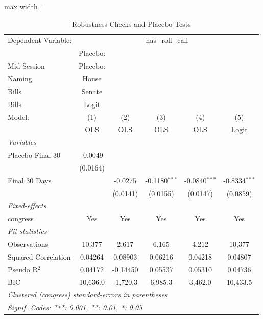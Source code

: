
\begin{table}[htbp]
   \caption{\label{tab:robust} Robustness Checks and Placebo Tests}
   \centering
   \small
   \begin{adjustbox}{max width=\textwidth}
   \begin{tabular}{lccccc}
      \tabularnewline \midrule \midrule
      Dependent Variable: & \multicolumn{5}{c}{has\_roll\_call}\\
                          & Placebo:\\Mid-Session   & Placebo:\\Naming   & House\\Bills    & Senate\\Bills   & Logit \\   
      Model:              & (1)                     & (2)                & (3)             & (4)             & (5)\\  
                          &  OLS                    & OLS                & OLS             & OLS             & Logit\\  
      \midrule
      \emph{Variables}\\
      Placebo Final 30    & -0.0049                 &                    &                 &                 &   \\   
                          & (0.0164)                &                    &                 &                 &   \\   
      Final 30 Days       &                         & -0.0275            & -0.1180$^{***}$ & -0.0840$^{***}$ & -0.8334$^{***}$\\   
                          &                         & (0.0141)           & (0.0155)        & (0.0147)        & (0.0859)\\   
      \midrule
      \emph{Fixed-effects}\\
      congress            & Yes                     & Yes                & Yes             & Yes             & Yes\\  
      \midrule
      \emph{Fit statistics}\\
      Observations        & 10,377                  & 2,617              & 6,165           & 4,212           & 10,377\\  
      Squared Correlation & 0.04264                 & 0.08903            & 0.06216         & 0.04218         & 0.04807\\  
      Pseudo R$^2$        & 0.04172                 & -0.14450           & 0.05537         & 0.05310         & 0.04736\\  
      BIC                 & 10,636.0                & -1,720.3           & 6,985.3         & 3,462.0         & 10,433.5\\  
      \midrule \midrule
      \multicolumn{6}{l}{\emph{Clustered (congress) standard-errors in parentheses}}\\
      \multicolumn{6}{l}{\emph{Signif. Codes: ***: 0.001, **: 0.01, *: 0.05}}\\
   \end{tabular}
   \end{adjustbox}


\end{table}
